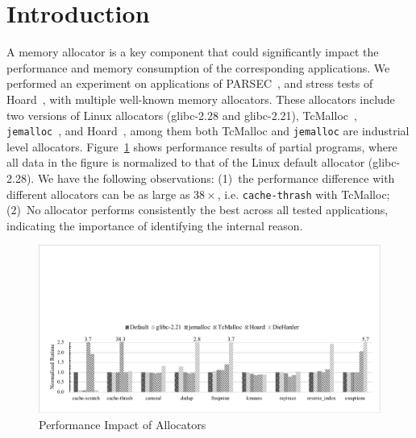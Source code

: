 

\section{Introduction}

A memory allocator is a key component that could significantly impact the performance and memory consumption of the corresponding applications. We performed an experiment on applications of PARSEC~\cite{parsec}, and stress tests of Hoard~\cite{Hoard}, with multiple well-known memory allocators. These allocators include two versions of Linux allocators (glibc-2.28 and glibc-2.21), TcMalloc~\cite{tcmalloc}, \texttt{jemalloc}~\cite{jemalloc}, and Hoard~\cite{Hoard}, among them both TcMalloc and \texttt{jemalloc} are industrial level allocators. Figure~\ref{fig:motivation} shows performance results of partial programs, where all data in the figure is normalized to that of the Linux default allocator (glibc-2.28). We have the following observations: (1)~the performance difference with different allocators can be as large as $38\times$, i.e. \texttt{cache-thrash} with TcMalloc; (2)~No allocator performs consistently the best across all tested applications, indicating the importance of identifying the internal reason.

\begin{figure}[!ht]
\centering
\includegraphics[width=0.98\columnwidth]{figures/motivation}
\caption{Performance Impact of Allocators\label{fig:motivation}}
\end{figure}

